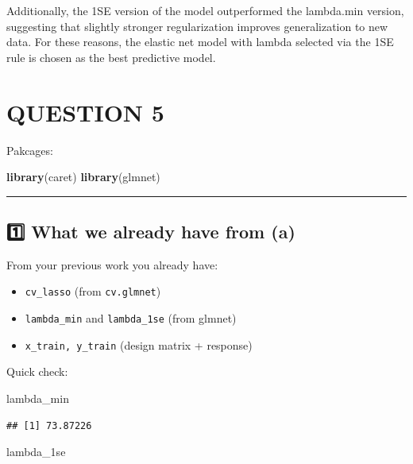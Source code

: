 \documentclass[
]{article}
\newenvironment{Shaded}{\begin{snugshade}}{\end{snugshade}}
\newcommand{\FunctionTok}[1]{\textcolor[rgb]{0.13,0.29,0.53}{\textbf{#1}}}
\newcommand{\NormalTok}[1]{#1}
\providecommand{\tightlist}{%
  \setlength{\itemsep}{0pt}\setlength{\parskip}{0pt}}
\begin{document}
Additionally, the 1SE version of the model outperformed the lambda.min
version, suggesting that slightly stronger regularization improves
generalization to new data. For these reasons, the elastic net model
with lambda selected via the 1SE rule is chosen as the best predictive
model.

\section{QUESTION 5}\label{question-5}

Pakcages:

\begin{Shaded}
\begin{Highlighting}[]
\FunctionTok{library}\NormalTok{(caret)}
\FunctionTok{library}\NormalTok{(glmnet)}
\end{Highlighting}
\end{Shaded}

\begin{center}\rule{0.5\linewidth}{0.5pt}\end{center}

\subsection{1️⃣ What we already have from
(a)}\label{what-we-already-have-from-a}

From your previous work you already have:

\begin{itemize}
\tightlist
\item
  \texttt{cv\_lasso} (from \texttt{cv.glmnet})
\item
  \texttt{lambda\_min} and \texttt{lambda\_1se} (from glmnet)
\item
  \texttt{x\_train,\ y\_train} (design matrix + response)
\end{itemize}

Quick check:

\begin{Shaded}
\begin{Highlighting}[]
\NormalTok{lambda\_min}
\end{Highlighting}
\end{Shaded}

\begin{verbatim}
## [1] 73.87226
\end{verbatim}

\begin{Shaded}
\begin{Highlighting}[]
\NormalTok{lambda\_1se}
\end{Highlighting}
\end{Shaded}
\end{document}
